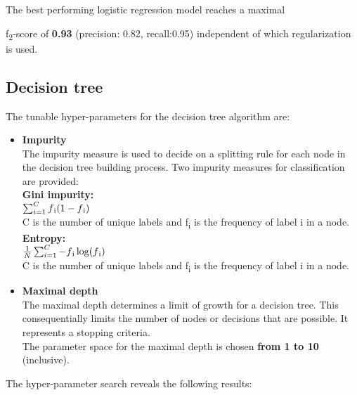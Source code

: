{The best performing logistic regression model reaches a maximal {f\textsubscript{2}-score of \textbf{0.93} (precision:  0.82, recall:0.95) independent of which regularization is used.

\subsection*{Decision tree}
The tunable hyper-parameters for the decision tree algorithm are:
\begin{itemize}
\item{\textbf{Impurity}}\\
The impurity measure is used to decide on a splitting rule for each node in the decision tree building process.
Two impurity measures for classification are provided:\\
\textbf{Gini impurity:}  \\
$\sum_{i=1}^{C} f\textsubscript{i}(1-f\textsubscript{i}) $ \\
C is the number of unique labels and f\textsubscript{i} is the frequency of label i in a node. \\
\textbf{Entropy:}\\
$\frac{1}{N}\sum_{i=1}^{C} -f\textsubscript{i}\log(f\textsubscript{i}) $ \\
C is the number of unique labels and f\textsubscript{i} is the frequency of label i in a node. \\
\item{\textbf{Maximal depth}}\\
The maximal depth determines a limit of growth for a decision tree. This consequentially limits the number of nodes or decisions that are possible. It represents a stopping criteria. \\
The parameter space for the maximal depth is chosen \textbf{from 1 to 10} (inclusive). 
\end{itemize}

The hyper-parameter search reveals the following results: \\

\pgfplotsset{width=1.1\textwidth, height=0.5\textwidth}

}}
